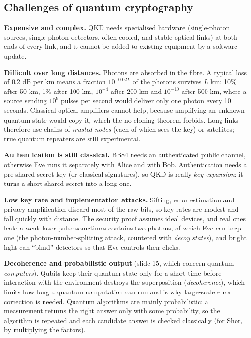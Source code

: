 \subsection{Challenges of quantum cryptography \new}

\textbf{Expensive and complex.} QKD needs specialised hardware (single-photon sources, single-photon detectors, often cooled, and stable optical links) at both ends of every link, and it cannot be added to existing equipment by a software update.

\textbf{Difficult over long distances.} Photons are absorbed in the fibre. A typical loss of 0.2 dB per km means a fraction $10^{-0.02L}$ of the photons survives $L$ km: 10\% after 50 km, 1\% after 100 km, $10^{-4}$ after 200 km and $10^{-10}$ after 500 km, where a source sending $10^9$ pulses per second would deliver only one photon every 10 seconds. Classical optical amplifiers cannot help, because amplifying an unknown quantum state would copy it, which the no-cloning theorem forbids. Long links therefore use chains of \emph{trusted nodes} (each of which sees the key) or satellites; true quantum repeaters are still experimental.

\textbf{Authentication is still classical.} BB84 needs an authenticated public channel, otherwise Eve runs it separately with Alice and with Bob. Authentication needs a pre-shared secret key (or classical signatures), so QKD is really \emph{key expansion}: it turns a short shared secret into a long one.

\textbf{Low key rate and implementation attacks.} Sifting, error estimation and privacy amplification discard most of the raw bits, so key rates are modest and fall quickly with distance. The security proof assumes ideal devices, and real ones leak: a weak laser pulse sometimes contains two photons, of which Eve can keep one (the photon-number-splitting attack, countered with \emph{decoy states}), and bright light can ``blind'' detectors so that Eve controls their clicks.

\textbf{Decoherence and probabilistic output} (slide 15, which concern quantum \emph{computers}). Qubits keep their quantum state only for a short time before interaction with the environment destroys the superposition (\emph{decoherence}), which limits how long a quantum computation can run and is why large-scale error correction is needed. Quantum algorithms are mainly probabilistic: a measurement returns the right answer only with some probability, so the algorithm is repeated and each candidate answer is checked classically (for Shor, by multiplying the factors).

